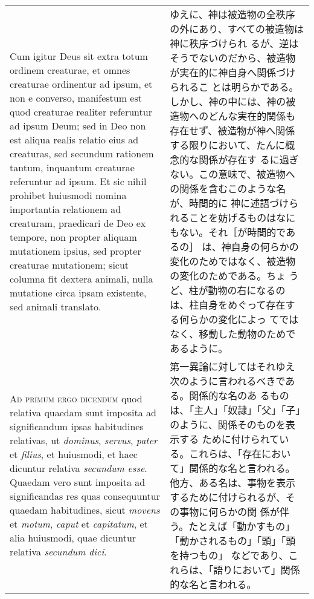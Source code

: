 \documentclass[10pt]{jsarticle}
\begin{document}
\begin{longtable}{p{21em}p{21em}}
\\

Cum igitur Deus sit extra totum ordinem creaturae, et omnes creaturae
ordinentur ad ipsum, et non e converso, manifestum est quod creaturae
realiter referuntur ad ipsum Deum; sed in Deo non est aliqua realis
relatio eius ad creaturas, sed secundum rationem tantum, inquantum
creaturae referuntur ad ipsum. Et sic nihil prohibet huiusmodi nomina
importantia relationem ad creaturam, praedicari de Deo ex tempore, non
propter aliquam mutationem ipsius, sed propter creaturae mutationem;
sicut columna fit dextera animali, nulla mutatione circa ipsam
existente, sed animali translato.

&

ゆえに、神は被造物の全秩序の外にあり、すべての被造物は神に秩序づけられ
るが、逆はそうでないのだから、被造物が実在的に神自身へ関係づけられるこ
とは明らかである。しかし、神の中には、神の被造物へのどんな実在的関係も
存在せず、被造物が神へ関係する限りにおいて、たんに概念的な関係が存在す
るに過ぎない。この意味で、被造物への関係を含むこのような名が、時間的に
神に述語づけられることを妨げるものはなにもない。それ［が時間的であるの］
は、神自身の何らかの変化のためではなく、被造物の変化のためである。ちょ
うど、柱が動物の右になるのは、柱自身をめぐって存在する何らかの変化によっ
てではなく、移動した動物のためであるように。

\\

{\scshape Ad primum ergo dicendum} quod relativa quaedam sunt imposita
ad significandum ipsas habitudines relativas, ut {\itshape dominus},
{\itshape servus}, {\itshape pater} et {\itshape filius}, et
huiusmodi, et haec dicuntur relativa {\itshape secundum esse}. Quaedam
vero sunt imposita ad significandas res quas consequuntur quaedam
habitudines, sicut {\itshape movens} et {\itshape motum}, {\itshape
caput} et {\itshape capitatum}, et alia huiusmodi, quae dicuntur
relativa {\itshape secundum dici}.

&

第一異論に対してはそれゆえ次のように言われるべきである。関係的な名のあ
るものは、「主人」「奴隷」「父」「子」のように、関係そのものを表示する
ために付けられている。これらは、「存在において」関係的な名と言われる。
他方、ある名は、事物を表示するために付けられるが、その事物に何らかの関
係が伴う。たとえば「動かすもの」「動かされるもの」「頭」「頭を持つもの」
などであり、これらは、「語りにおいて」関係的な名と言われる。

\\


\end{longtable}
\end{document}
